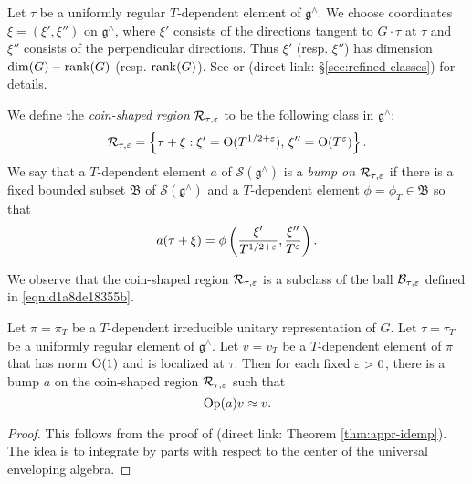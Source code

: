 \documentclass[reqno]{amsart} 
\numberwithin{equation}{section}
\numberwithin{theorem}{section}
\begin{document}
\begin{definition}
  Let $\tau$ be a uniformly regular $T$-dependent element of $\mathfrak{g}^\wedge$.  We choose coordinates $\xi = (\xi ', \xi '')$ on $\mathfrak{g}^\wedge$, where $\xi '$ consists of the directions tangent to $G \cdot \tau$ at $\tau$ and $\xi ''$ consists of the perpendicular directions.  Thus $\xi'$ (resp. $\xi ''$) has dimension $\dim(G) - \operatorname{rank}(G)$ (resp. $\operatorname{rank}(G)$).  See \cite[\S9.4.1]{2020arXiv201202187N} or \cite[\S13.3.4]{2021arXiv210915230N} (direct link: \S\ref{sec:refined-classes}) for details.

  We define the \emph{coin-shaped region} $\mathcal{R} _{\tau,\varepsilon}$ to be the following class in $\mathfrak{g}^\wedge$:
  \begin{equation*}
\mathcal{R}_{\tau,\varepsilon} = \left\{ \tau + \xi : \xi ' = \operatorname{O}(T^{1/2+\varepsilon}), \, \xi '' = \operatorname{O}(T^{\varepsilon}) \right\}.
\end{equation*}
We say that a $T$-dependent element $a$ of $\mathcal{S}(\mathfrak{g}^\wedge)$ is a \emph{bump on} $\mathcal{R}_{\tau,\varepsilon}$ if there is a fixed bounded subset $\mathfrak{B}$ of $\mathcal{S}(\mathfrak{g}^\wedge)$ and a $T$-dependent element $\phi = \phi_T \in \mathfrak{B}$ so that
\begin{equation*}
a(\tau + \xi ) = \phi\left(\frac{\xi ' }{ T^{1/2+\varepsilon}}, \frac{\xi '' }{ T^\varepsilon}\right).
\end{equation*}
\end{definition}
We observe that the coin-shaped region $\mathcal{R}_{\tau,\varepsilon}$ is a subclass of the ball $\mathcal{B}_{\tau,\varepsilon}$ defined in \eqref{eqn:d1a8de18355b}.

\begin{theorem}
  Let $\pi = \pi_T$ be a $T$-dependent irreducible unitary representation of $G$.  Let $\tau = \tau_T$ be a uniformly regular element of $\mathfrak{g}^\wedge$.  Let $v = v_T$ be a $T$-dependent element of $\pi$ that has norm $\operatorname{O}(1)$ and is localized at $\tau$.  Then for each fixed $\varepsilon > 0$, there is a bump $a$ on the coin-shaped region $\mathcal{R}_{\tau,\varepsilon}$ such that
  \begin{equation*}
    \operatorname{Op}(a) v \approx v.
  \end{equation*}
\end{theorem}
\begin{proof}
This follows from the proof of \cite[Thm 17.12]{2021arXiv210915230N} (direct link: Theorem \ref{thm:appr-idemp}).  The idea is to integrate by parts with respect to the center of the universal enveloping algebra.
\end{proof}
\end{document}
